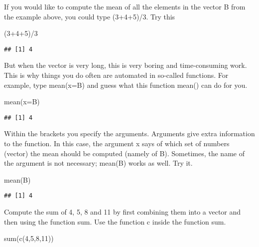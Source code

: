 \documentclass[
]{article}
\newenvironment{Shaded}{\begin{snugshade}}{\end{snugshade}}
\newcommand{\AttributeTok}[1]{\textcolor[rgb]{0.77,0.63,0.00}{#1}}
\newcommand{\DecValTok}[1]{\textcolor[rgb]{0.00,0.00,0.81}{#1}}
\newcommand{\FunctionTok}[1]{\textcolor[rgb]{0.00,0.00,0.00}{#1}}
\newcommand{\NormalTok}[1]{#1}
\newcommand{\SpecialCharTok}[1]{\textcolor[rgb]{0.00,0.00,0.00}{#1}}
\begin{document}
If you would like to compute the mean of all the elements in the vector
B from the example above, you could type (3+4+5)/3. Try this

\begin{Shaded}
\begin{Highlighting}[]
\NormalTok{(}\DecValTok{3}\SpecialCharTok{+}\DecValTok{4}\SpecialCharTok{+}\DecValTok{5}\NormalTok{)}\SpecialCharTok{/}\DecValTok{3}
\end{Highlighting}
\end{Shaded}

\begin{verbatim}
## [1] 4
\end{verbatim}

But when the vector is very long, this is very boring and time-consuming
work. This is why things you do often are automated in so-called
functions. For example, type mean(x=B) and guess what this function
mean() can do for you.

\begin{Shaded}
\begin{Highlighting}[]
\FunctionTok{mean}\NormalTok{(}\AttributeTok{x=}\NormalTok{B)}
\end{Highlighting}
\end{Shaded}

\begin{verbatim}
## [1] 4
\end{verbatim}

Within the brackets you specify the arguments. Arguments give extra
information to the function. In this case, the argument x says of which
set of numbers (vector) the mean should be computed (namely of B).
Sometimes, the name of the argument is not necessary; mean(B) works as
well. Try it.

\begin{Shaded}
\begin{Highlighting}[]
\FunctionTok{mean}\NormalTok{(B)}
\end{Highlighting}
\end{Shaded}

\begin{verbatim}
## [1] 4
\end{verbatim}

Compute the sum of 4, 5, 8 and 11 by first combining them into a vector
and then using the function sum. Use the function c inside the function
sum.

\begin{Shaded}
\begin{Highlighting}[]
\FunctionTok{sum}\NormalTok{(}\FunctionTok{c}\NormalTok{(}\DecValTok{4}\NormalTok{,}\DecValTok{5}\NormalTok{,}\DecValTok{8}\NormalTok{,}\DecValTok{11}\NormalTok{))}
\end{Highlighting}
\end{Shaded}
\end{document}
